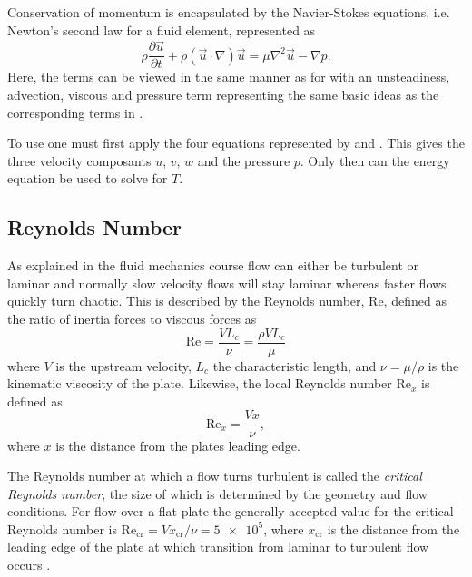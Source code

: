 Conservation of momentum is encapsulated by the Navier-Stokes equations, i.e. Newton's  second law for a fluid element, represented as 
\begin{equation} \label{eq:navstokes}
  \rho \frac{\partial \Vec{u}}{\partial t} + \rho \left( \Vec{u} \cdot \nabla  \right)\Vec{u} = \mu \nabla^2 \Vec{u} - \nabla  p 
.\end{equation}
Here, the terms can be viewed in the same manner as for  with an unsteadiness, advection, viscous and pressure term representing the same basic ideas as the corresponding terms in .

To use  one must first apply the four equations represented by  and .
This gives the three velocity composants $u$, $v$, $w$ and the pressure $p$.
Only then can the energy equation  be used to solve for $T$.

\subsection{Reynolds Number}
As explained in the fluid mechanics course \cite{hansen2026fluidmechanics} flow can either be turbulent or laminar and normally slow velocity flows will stay laminar whereas faster flows quickly turn chaotic.
This is described by the Reynolds number, $\mathrm{Re}$, defined as the ratio of inertia forces to viscous forces as 
\begin{equation*}
  \mathrm{Re} = \frac{V L_c}{\nu} = \frac{\rho V L_c}{\mu}
\end{equation*}
where $V$ is the upstream velocity, $L_c$ the characteristic length, and $\nu = \mu / \rho$ is the kinematic viscosity of the plate.
Likewise, the local Reynolds number $\mathrm{Re}_x$ is defined as
\begin{equation*}
  \mathrm{Re}_x = \frac{Vx}{\nu}
,\end{equation*}
where $x$ is the distance from the plates leading edge.

The Reynolds number at which a flow turns turbulent is called the \textit{critical Reynolds number}, the size of which is determined by the geometry and flow conditions.
For flow over a flat plate the generally accepted value for the critical Reynolds number is $\mathrm{Re}_{\mathrm{cr}} = V x_{\mathrm{cr}} / \nu = \num{5e5}$, where $x_{\mathrm{cr}}$ is the distance from the leading edge of the plate at which transition from laminar to turbulent flow occurs .

